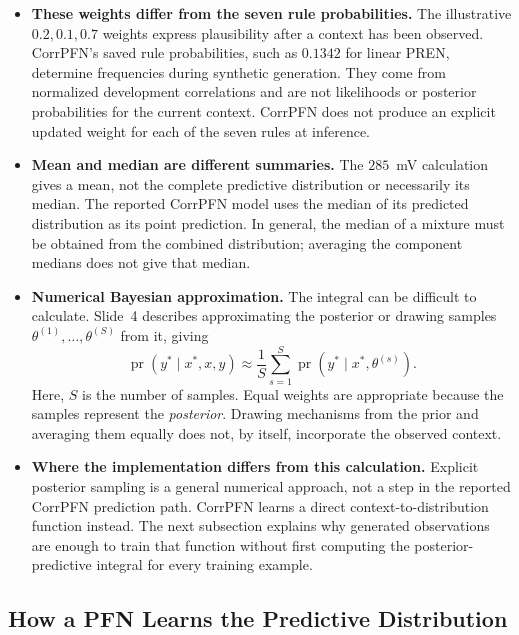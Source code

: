 \documentclass[11pt]{article}
\newcommand{\pr}{\operatorname{pr}}
\newenvironment{notes}
  {\begin{itemize}\setlength{\itemsep}{0.45em}\setlength{\parsep}{0pt}}
  {\end{itemize}}
\begin{document}
\begin{notes}
    \item \textbf{These weights differ from the seven rule probabilities.}
    The illustrative \(0.2,0.1,0.7\) weights express plausibility
    after a context has been observed. CorrPFN's saved rule
    probabilities, such as \(0.1342\) for linear PREN, determine
    frequencies during synthetic generation. They come from
    normalized development correlations and are not likelihoods
    or posterior probabilities for the current context. CorrPFN
    does not produce an explicit updated weight for each of the
    seven rules at inference.

    \item \textbf{Mean and median are different summaries.}
    The \(285\)~mV calculation gives a mean, not the complete
    predictive distribution or necessarily its median. The
    reported CorrPFN model uses the median of its predicted
    distribution as its point prediction.
    In general, the median of a mixture must be obtained from
    the combined distribution; averaging the component medians
    does not give that median.

    \item \textbf{Numerical Bayesian approximation.} The integral
    can be difficult to calculate. Slide~4 describes approximating
    the posterior or drawing samples
    \(\theta^{(1)},\ldots,\theta^{(S)}\) from it, giving
    \[
        \pr(y^\ast\mid x^\ast,x,y)
        \approx
        \frac{1}{S}\sum_{s=1}^{S}
        \pr(y^\ast\mid x^\ast,\theta^{(s)}).
    \]
    Here, \(S\) is the number of samples. Equal weights are
    appropriate because the samples represent the
    \emph{posterior}. Drawing mechanisms from the prior and
    averaging them equally does not, by itself, incorporate the
    observed context.

    \item \textbf{Where the implementation differs from this calculation.}
    Explicit posterior sampling is a general numerical approach,
    not a step in the reported CorrPFN prediction path. CorrPFN
    learns a direct context-to-distribution function instead.
    The next subsection explains why generated observations are
    enough to train that function without first computing the
    posterior-predictive integral for every training example.
\end{notes}

\subsection{How a PFN Learns the Predictive Distribution}
\label{sec:pfn-pretraining}
\end{document}
